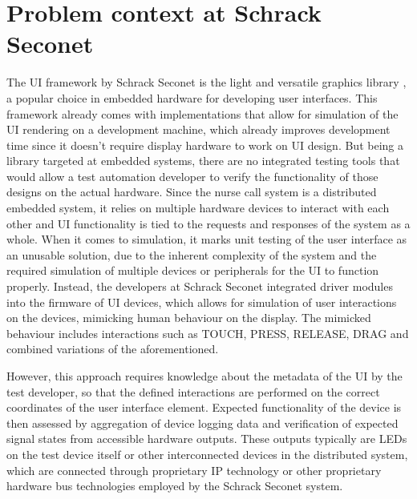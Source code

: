 \documentclass[Proposal,BIC,english,fhCitStyle,IEEE]{BASE/twbook} %
\begin{document}
\section{Problem context at Schrack Seconet}
The UI framework by Schrack Seconet is the light and versatile graphics library , a popular choice in embedded hardware for developing user interfaces. This framework already comes with implementations that allow for simulation of the UI rendering on a development machine, which already improves development time since it doesn't require display hardware to work on UI design.
But being a library targeted at embedded systems, there are no integrated testing tools that would allow a test automation developer to verify the functionality of those designs on the actual hardware. Since the nurse call system  is a distributed embedded system, it relies on multiple hardware devices to interact with each other and UI functionality is tied to the requests and responses of the system as a whole.
When it comes to simulation, it marks unit testing of the user interface as an unusable solution, due to the inherent complexity of the system and the required simulation of multiple devices or peripherals for the UI to function properly.
Instead, the developers at Schrack Seconet integrated driver modules into the firmware of UI devices, which allows for simulation of user interactions on the devices, mimicking human behaviour on the display. The mimicked behaviour includes interactions such as TOUCH, PRESS, RELEASE, DRAG and combined variations of the aforementioned.

However, this approach requires knowledge about the metadata of the UI by the test developer, so that the defined interactions are performed on the correct coordinates of the user interface element. Expected functionality of the device is then assessed by aggregation of device logging data and verification of expected signal states from accessible hardware outputs. These outputs typically are LEDs on the test device itself or other interconnected devices in the distributed system, which are connected through proprietary IP technology or other proprietary hardware bus technologies employed by the Schrack Seconet system.
\end{document}
